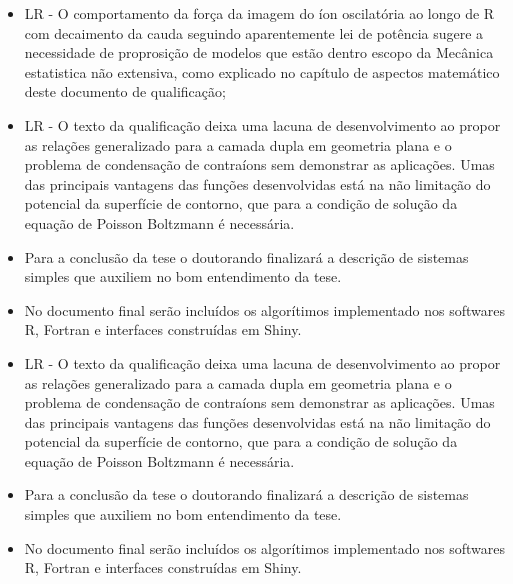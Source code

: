 \documentclass{beamer}
\begin{document}
\begin{frame}
	\begin{itemize}
\item LR - O comportamento da força da imagem do íon oscilatória ao longo de R 
      com decaimento da cauda seguindo aparentemente lei de potência sugere a 
      necessidade de proprosição de modelos que estão dentro escopo da Mecânica 
      estatistica não extensiva, como explicado no capítulo de aspectos matemático 
      deste documento de qualificação; 
\item LR - O texto da qualificação deixa uma lacuna de desenvolvimento ao propor 
      as relações generalizado para a camada dupla em geometria plana e o problema 
      de condensação de contraíons sem demonstrar as aplicações. Umas das principais
      vantagens das funções desenvolvidas está na não limitação do potencial da 
      superfície de contorno, que para a condição de solução da equação de Poisson
      Boltzmann é necessária. 
\item Para a conclusão da tese o doutorando finalizará a descrição de sistemas simples 
      que auxiliem no bom entendimento da tese. 
\item No documento final serão incluídos os algorítimos implementado nos softwares R, Fortran
      e interfaces construídas em Shiny. 
\end{itemize}

\end{frame}

\begin{frame}
	\begin{itemize}
\item LR - O texto da qualificação deixa uma lacuna de desenvolvimento ao propor 
      as relações generalizado para a camada dupla em geometria plana e o problema 
      de condensação de contraíons sem demonstrar as aplicações. Umas das principais
      vantagens das funções desenvolvidas está na não limitação do potencial da 
      superfície de contorno, que para a condição de solução da equação de Poisson
      Boltzmann é necessária. 
\item Para a conclusão da tese o doutorando finalizará a descrição de sistemas simples 
      que auxiliem no bom entendimento da tese. 
\item No documento final serão incluídos os algorítimos implementado nos softwares R, Fortran
      e interfaces construídas em Shiny. 
	\end{itemize}
\end{frame}
\end{document}
